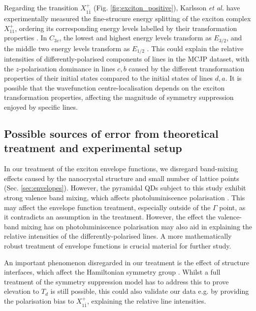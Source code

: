 Regarding the transition $X^+_{1\bar{1}}$ (Fig. \ref{fig:exciton_positive}), Karlsson \textit{et al.} have experimentally measured the fine-strucure energy splitting of the exciton complex $X^+_{11}$, ordering its corresponding energy levels labelled by their transformation properties \cite[p. 16]{karlsson}. In $C_{3v}$, the lowest and highest energy levels transform as $E_{3/2}$, and the middle two energy levels transform as $E_{1/2}$ \cite[Fig. 17]{karlsson}. This could explain the relative intensities of differently-polarised components of lines in the MCJP dataset, with the $z$-polarisation dominance in lines $c,b$ caused by the different transformation properties of their initial states compared to the initial states of lines $d,a$. It is possible that the wavefunction centre-localisation depends on the exciton transformation properties, affecting the magnitude of symmetry suppression enjoyed by specific lines.

\subsection{Possible sources of error from theoretical treatment and experimental setup}

In our treatment of the exciton envelope functions, we disregard band-mixing effects caused by the nanocrystal structure and small number of lattice points (Sec. \ref{sec:envelopes}). However, the pyramidal QDs subject to this study exhibit strong valence band mixing, which affects photoluminiscence polarisation \cite{strong_band_mixing}. This may affect the envelope function treatment, especially outside of the $\Gamma$ point, as it contradicts an assumption in the treatment. However, the effect the valence-band mixing has on photoluminiscence polarisation may also aid in explaining the relative intensities of the differently-polarised lines. A more mathematically robust treatment of envelope functions is crucial material for further study.

An important phenomenon disregarded in our treatment is the effect of structure interfaces, which affect the Hamiltonian symmetry group \cite{interfaces}. Whilst a full treatment of the symmetry suppression model has to address this to prove elevation to $T_d$ is still possible, this could also validate our data e.g. by providing the polarisation bias to $X^+_{1\bar{1}}$, explaining the relative line intensities.

